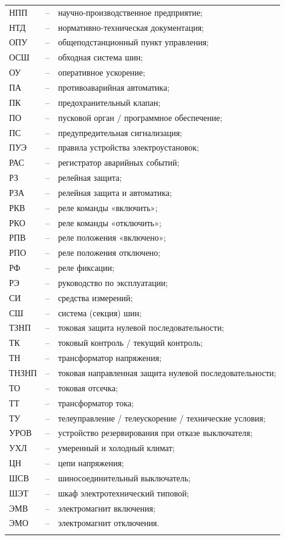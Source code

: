 \begin{longtable}{>{\raggedright\arraybackslash}m{2cm}>{\raggedright\arraybackslash}m{0.5cm}>{\raggedright\arraybackslash}m{20cm}}
НПП & -- & научно-производственное предприятие; \\
НТД & -- & нормативно-техническая документация; \\
ОПУ & -- & общеподстанционный пункт управления; \\
ОСШ & -- & обходная система шин; \\
ОУ & -- & оперативное ускорение; \\
ПА & -- & противоаварийная автоматика; \\
ПК & -- & предохранительный клапан; \\
ПО & -- & пусковой орган / программное обеспечение; \\
ПС & -- & предупредительная сигнализация; \\
ПУЭ & -- & правила устройства электроустановок; \\
РАС & -- & регистратор аварийных событий; \\
РЗ & -- & релейная защита; \\
РЗА & -- & релейная защита и автоматика; \\
РКВ & -- & реле команды «включить»; \\
РКО & -- & реле команды «отключить»; \\
РПВ & -- & реле положения «включено»; \\
РПО & -- & реле положения отключено; \\
РФ & -- & реле фиксации; \\
РЭ & -- & руководство по эксплуатации; \\
СИ & -- & средства измерений; \\
СШ & -- & система (секция) шин; \\
ТЗНП & -- & токовая защита нулевой последовательности; \\
ТК & -- & токовый контроль / текущий контроль; \\
ТН & -- & трансформатор напряжения; \\
ТНЗНП & -- & токовая направленная защита нулевой последовательности; \\
ТО & -- & токовая отсечка; \\
ТТ & -- & трансформатор тока; \\
ТУ & -- & телеуправление / телеускорение / технические условия; \\
УРОВ & -- & устройство резервирования при отказе выключателя; \\
УХЛ & -- & умеренный и холодный климат; \\
ЦН & -- & цепи напряжения; \\
ШСВ & -- & шиносоединительный выключатель; \\
ШЭТ & -- & шкаф электротехнический типовой; \\
ЭМВ & -- & электромагнит включения; \\
ЭМО & -- & электромагнит отключения. \\
{\color{white}\fontsize{0.1pt}{0.1pt}\selectfont<endABBRS>}
\end{longtable}
